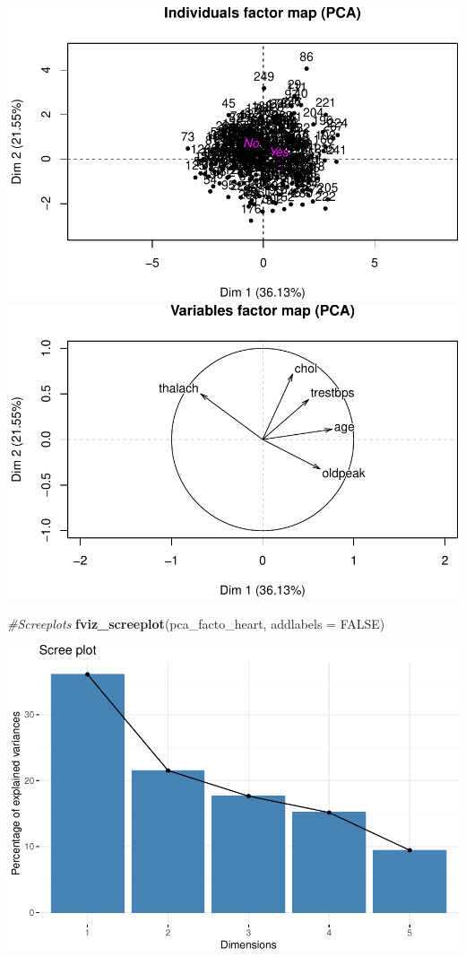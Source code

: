 \documentclass[]{article}
\newenvironment{Shaded}{\begin{snugshade}}{\end{snugshade}}
\newcommand{\KeywordTok}[1]{\textcolor[rgb]{0.13,0.29,0.53}{\textbf{#1}}}
\newcommand{\DataTypeTok}[1]{\textcolor[rgb]{0.13,0.29,0.53}{#1}}
\newcommand{\CommentTok}[1]{\textcolor[rgb]{0.56,0.35,0.01}{\textit{#1}}}
\newcommand{\OtherTok}[1]{\textcolor[rgb]{0.56,0.35,0.01}{#1}}
\newcommand{\NormalTok}[1]{#1}
\begin{document}
\includegraphics{project_report_files/figure-latex/unnamed-chunk-7-1.pdf}
\includegraphics{project_report_files/figure-latex/unnamed-chunk-7-2.pdf}

\begin{Shaded}
\begin{Highlighting}[]
\CommentTok{#Screeplots}
\KeywordTok{fviz_screeplot}\NormalTok{(pca_facto_heart, }\DataTypeTok{addlabels =} \OtherTok{FALSE}\NormalTok{)}
\end{Highlighting}
\end{Shaded}

\includegraphics{project_report_files/figure-latex/unnamed-chunk-8-1.pdf}
\end{document}
